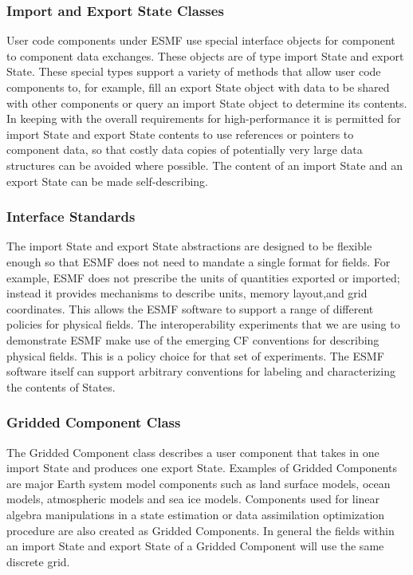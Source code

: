 \subsubsection{Import and Export State Classes}
User code components under ESMF use special interface objects for component to component data exchanges. These objects are 
of type import State and export State. These special types support a variety of methods that allow user code components 
to, for example, fill an export State object with data to be shared with other components or query an import State object to 
determine its contents. In keeping with the overall requirements for high-performance it is permitted for import State and
export State contents to use references or pointers to component data, so that costly data copies of potentially
very large data structures can be avoided where possible. The content of an import State and an export State can be made 
self-describing.

\subsubsection{Interface Standards}
The import State and export State abstractions are designed to be flexible enough so
that ESMF does not need to mandate a single format for fields. For example, ESMF does not prescribe the units
of quantities exported or imported; instead it provides mechanisms to describe units, memory layout,and grid coordinates.  This allows the ESMF software to support a range of different policies for
physical fields. The interoperability experiments that we are using to demonstrate ESMF make use of the emerging
CF conventions \cite{ref:CF} for describing physical fields. This is a policy choice for that set of experiments. The ESMF 
software itself can support arbitrary conventions for labeling and characterizing the contents of States.

\subsubsection{Gridded Component Class}
The Gridded Component class describes a user component that takes in one import State and produces one
export State. Examples of Gridded Components are major Earth system 
model components such as land surface models, ocean models, atmospheric models and sea ice models. Components 
used for linear algebra manipulations in a state estimation or data assimilation optimization procedure are also 
created as Gridded Components. In general the fields within an import State and export State of a Gridded Component will 
use the same discrete grid.

